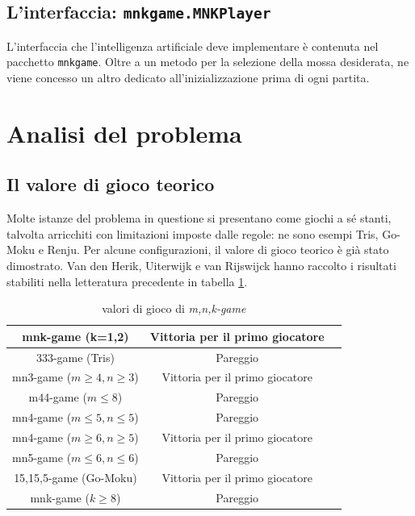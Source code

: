 \documentclass{article}
\begin{document}
\subsection{L'interfaccia: \texttt{mnkgame.MNKPlayer}}

L'interfaccia che l'intelligenza artificiale deve implementare è contenuta nel
pacchetto \verb!mnkgame!. Oltre a un metodo per la selezione della mossa
desiderata, ne viene concesso un altro dedicato all'inizializzazione prima di
ogni partita.

\section{Analisi del problema}

\subsection{Il valore di gioco teorico}

Molte istanze del problema in questione si presentano come giochi a sé stanti,
talvolta arricchiti con limitazioni imposte dalle regole: ne sono esempi Tris,
Go-Moku e Renju. Per alcune configurazioni, il valore di gioco teorico è già
stato dimostrato. Van den Herik, Uiterwijk e van Rijswijck
\cite{VANDENHERIK2002277} hanno raccolto i risultati stabiliti nella letteratura
precedente in tabella \ref{table:2}.

\begin{table}[h!]
  \centering
  \begin{tabular}{ | c | c | c | }
    \hline
    mnk-game (k=1,2) & Vittoria per il primo giocatore \\
    \hline
    333-game (Tris) & Pareggio \\
    \hline
    mn3-game ($m \geq 4, n \geq 3$) & Vittoria per il primo giocatore \\
    \hline
    m44-game ($m \leq 8$) & Pareggio \\
    \hline
    mn4-game ($m \leq 5,n \leq 5$) & Pareggio \\
    \hline
    mn4-game ($m \geq 6,n \geq 5$) & Vittoria per il primo giocatore \\
    \hline
    mn5-game ($m \leq 6,n \leq 6$) & Pareggio \\
    \hline
    15,15,5-game (Go-Moku) & Vittoria per il primo giocatore \\
    \hline
    mnk-game ($k \geq 8$) & Pareggio \\
    \hline
  \end{tabular}
    \caption{valori di gioco di \emph{m,n,k-game}}
    \label{table:2}
  \end{table}
\end{document}

